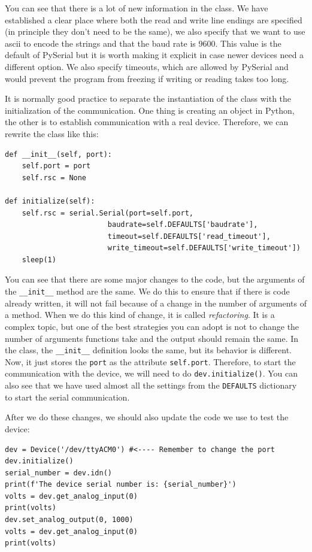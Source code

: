 You can see that there is a lot of new information in the class. We have established a clear place where both the read and write line endings are specified (in principle they don't need to be the same), we also specify that we want to use ascii to encode the strings and that the baud rate is 9600. This value is the default of PySerial but it is worth making it explicit in case newer devices need a different option. We also specify timeouts, which are allowed by PySerial and would prevent the program from freezing if writing or reading takes too long.

It is normally good practice to separate the instantiation of the class with the initialization of the communication. One thing is creating an object in Python, the other is to establish communication with a real device. Therefore, we can rewrite the class like this:

\begin{verbatim}
def __init__(self, port):
    self.port = port
    self.rsc = None

def initialize(self):
    self.rsc = serial.Serial(port=self.port,
                        baudrate=self.DEFAULTS['baudrate'],
                        timeout=self.DEFAULTS['read_timeout'],
                        write_timeout=self.DEFAULTS['write_timeout'])
    sleep(1)
\end{verbatim}

You can see that there are some major changes to the code, but the arguments of the \texttt{__init__} method are the same. We do this
to ensure that if there is code already written, it will not fail because of a change in the number of arguments of a method. When we do this kind of change, it is called \emph{refactoring}. It is a complex topic, but one of the best strategies you can adopt is not to change the number of arguments functions take and the output should remain the same. In the class, the \texttt{__init__} definition looks the same, but its behavior is different. Now, it just stores the \texttt{port} as the attribute \texttt{self.port}. Therefore, to start the communication with the device, we will need to do \texttt{dev.initialize()}. You can also see that we have used almost all the settings from the \texttt{DEFAULTS} dictionary to start the serial communication.

After we do these changes, we should also update the code we use to test the device:

\begin{verbatim}
dev = Device('/dev/ttyACM0') #<---- Remember to change the port
dev.initialize()
serial_number = dev.idn()
print(f'The device serial number is: {serial_number}')
volts = dev.get_analog_input(0)
print(volts)
dev.set_analog_output(0, 1000)
volts = dev.get_analog_input(0)
print(volts)
\end{verbatim}

